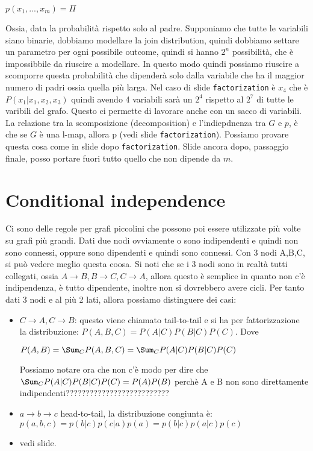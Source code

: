 \begin{center}
	$\displaystyle p(x_1, ..., x_m)=\Pi_{}$
\end{center}
Ossia, data la probabilità rispetto solo al padre.\newline
Supponiamo che tutte le variabili siano binarie, dobbiamo modellare la join distribution, quindi dobbiamo settare un parametro per ogni possibile outcome, quindi si hanno $2^n$ possibilità, che è impossibbile da riuscire a modellare. In questo modo quindi possiamo riuscire a scomporre questa probabilità che dipenderà solo dalla variabile che ha il maggior numero di padri ossia quella più larga. Nel caso di slide \texttt{factorization} è $x_4$ che è $P(x_1\vert x_1, x_2, x_3)$ quindi avendo 4 variabili sarà un $2^4$ rispetto al $2^7$ di tutte le varibili del grafo. Questo ci permette di lavorare anche con un sacco di variabili.  \newline
La relazione tra la scomposizione (decomposition) e l'indiepdnenza tra $G$ e $p$, è che se $G$ è una l-map, allora p (vedi slide \texttt{factorization}).\newline
Possiamo provare questa cosa come in slide dopo \texttt{factorization}.\newline
Slide ancora dopo, passaggio finale, posso portare fuori tutto quello che non dipende da $m$. \newline
\section{Conditional independence}
Ci sono delle regole per grafi piccolini che possono poi essere utilizzate più volte su grafi più grandi. Dati due nodi ovviamente o sono indipendenti e quindi non sono connessi, oppure sono dipendenti e quindi sono connessi. Con 3 nodi A,B,C, si può vedere meglio questa coosa. Si noti che se i 3 nodi sono in realtà tutti collegati, ossia $A\rightarrow B, B\rightarrow C, C\rightarrow A$, allora questo è semplice in quanto non c'è indipendenza, è tutto dipendente, inoltre non si dovrebbero avere cicli. Per tanto dati 3 nodi e al più 2 lati, allora possiamo distinguere dei casi:
\begin{itemize}
	\item $C\rightarrow A, C\rightarrow B$: questo viene chiamato tail-to-tail e si ha per fattorizzazione la distribuzione: $P(A, B, C)=P(A\vert C)P(B\vert C)P(C)$. Dove 
		\begin{center}
			$\displaystyle P(A, B)=\Sum_CP(A,B,C)=\Sum_CP(A\vert C)P(B\vert C)P(C)$
		\end{center} 
		Possiamo notare ora che non c'è modo per dire che $\Sum_CP(A\vert C)P(B\vert C)P(C)=P(A)P(B)$ perchè A e B non sono direttamente indipendenti??????????????????????????
	\item $a\rightarrow b\rightarrow c$ head-to-tail, la distribuzione congiunta è: $p(a,b,c)=p(b\vert c)p(c\vert a)p(a)=p(b\vert c)p(a\vert c)p(c)$
	\item vedi slide.
\end{itemize}

